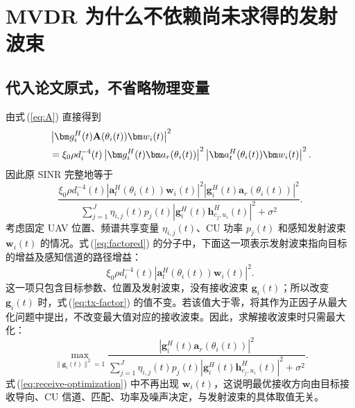 \section{MVDR 为什么不依赖尚未求得的发射波束}
\subsection{代入论文原式，不省略物理变量}
由式\,(\ref{eq:A}) 直接得到
\begin{align}
&\left|\bm g_i^H(t)\mathbf A(\theta_i(t))\bm w_i(t)\right|^2\notag\\
&=\xi_0\rho d_i^{-4}(t)
\left|\bm g_i^H(t)\bm a_r(\theta_i(t))\right|^2
\left|\bm a_t^H(\theta_i(t))\bm w_i(t)\right|^2.\label{eq:factor}
\end{align}
因此原 SINR 完整地等于
\begin{equation}\label{eq:factored}
\frac{\xi_0\rho d_i^{-4}(t)
\left|\bm a_t^H(\theta_i(t))\bm w_i(t)\right|^2
\left|\bm g_i^H(t)\bm a_r(\theta_i(t))\right|^2}
{\displaystyle\sum_{j=1}^J\eta_{i,j}(t)p_j(t)
\left|\bm g_i^H(t)\bm h_{c_j,u_i}^{H}(t)\right|^2+\sigma^2}.
\end{equation}
考虑固定 UAV 位置、频谱共享变量 $\eta_{i,j}(t)$、CU 功率 $p_j(t)$ 和感知发射波束 $\bm w_i(t)$ 的情况。式\,(\ref{eq:factored}) 的分子中，下面这一项表示发射波束指向目标的增益及感知信道的路径增益：
\begin{equation}\label{eq:tx-factor}
\xi_0\rho d_i^{-4}(t)
\left|\bm a_t^H(\theta_i(t))\bm w_i(t)\right|^2.
\end{equation}
这一项只包含目标参数、位置及发射波束，没有接收波束 $\bm g_i(t)$；所以改变 $\bm g_i(t)$ 时，式\,(\ref{eq:tx-factor}) 的值不变。若该值大于零，将其作为正因子从最大化问题中提出，不改变最大值对应的接收波束。因此，求解接收波束时只需最大化：
\begin{equation}\label{eq:receive-optimization}
\max_{\|\bm g_i(t)\|^2=1}
\frac{\left|\bm g_i^H(t)\bm a_r(\theta_i(t))\right|^2}
{\displaystyle\sum_{j=1}^J\eta_{i,j}(t)p_j(t)
\left|\bm g_i^H(t)\bm h_{c_j,u_i}^{H}(t)\right|^2+\sigma^2}.
\end{equation}
式\,(\ref{eq:receive-optimization}) 中不再出现 $\bm w_i(t)$，这说明最优接收方向由目标接收导向、CU 信道、匹配、功率及噪声决定，与发射波束的具体取值无关。

